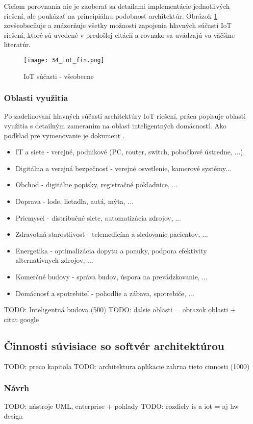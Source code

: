 Cieľom porovnania nie je zaoberať sa detailami implementácie jednotlivých riešení, ale poukázať na principiálnu podobnosť architektúr. Obrázok \ref{34_iot_fin} zovšeobecňuje a znázorňuje všetky možnosti zapojenia hlavných súčastí IoT riešení, ktoré sú uvedené v predošlej citácií a rovnako sa uvádzajú vo väčšine literatúr.
\begin{figure}[h]
\centering
\texttt{[image: 34\_iot\_fin.png]}
\caption{IoT súčasti - všeobecne\cite{IOT23}}
\label{34_iot_fin}
\end{figure} 
\subsubsection{Oblasti využitia}
Po zadefinovaní hlavných súčasti architektúry IoT riešení, práca popisuje oblasti využitia s detailným zameraním na oblasť inteligentných domácností. Ako podklad pre vymenovanie je dokument \cite{IOT24}.
\begin{itemize}
\item IT a siete - verejné, podnikové (PC, router, switch, pobočkové ústredne, ...).
\item Digitálna a verejná bezpečnosť - verejné osvetlenie, kamerové systémy...
\item Obchod - digitálne popisky, registračné pokladnice, ... 
\item Doprava - lode, lietadla, autá, mýta, ...
\item Priemysel - distribučné siete, automatizácia zdrojov, ...
\item Zdravotná starostlivosť - telemedicína a sledovanie pacientov, ...
\item Energetika - optimalizácia dopytu a ponuky, podpora efektivity alternatívnych zdrojov, ...
\item Komerčné budovy - správa budov, úspora na prevádzkovanie, ...
\item Domácnosť a spotrebiteľ - pohodlie a zábava, spotrebiče, ...
\end{itemize}

 
TODO: Inteligentná budova (500)
TODO: dalsie oblasti = obrazok oblasti + citat google

\subsection{Činnosti súvisiace so softvér architektúrou}
TODO: preco kapitola 
TODO: architektura aplikacie zahrna tieto cinnosti (1000)
\subsubsection{Návrh}
TODO: nástroje UML, enterprise + pohlady
TODO: rozdiely is a iot = aj hw design 
